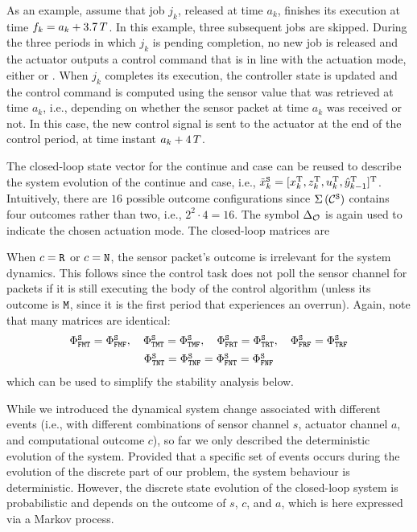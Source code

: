 As an example, assume that job $j_k$, released at time $a_k$, finishes its execution at time $f_k = a_k + 3.7\,T$.
In this example, three subsequent jobs are skipped.
During the three periods in which $j_k$ is pending completion, no new job is released and the actuator outputs a control command that is in line with the actuation mode, either \tH{} or \tZ{}.
When $j_k$ completes its execution, the controller state is updated and the control command is computed using the sensor value that was retrieved at time $a_k$, i.e., depending on whether the sensor packet at time $a_k$ was received or not.
In this case, the new control signal is sent to the actuator at the end of the control period, at time instant $a_k+4\,T$.

The closed-loop state vector for the continue and \tK{} case can be reused to describe the system evolution of the continue and \tS{} case, i.e., $\tilde x_k^{\texttt{S}} = [ x_k^{\mathrm{\small{T}}}{}, z_k^{\mathrm{\small{T}}}{}, u_k^{\mathrm{\small{T}}}{}, \hat y_{k-1}^{\mathrm{\small{T}}}{} ]^{\mathrm{\small{T}}}{}$.
Intuitively, there are $16$ possible outcome configurations since $\Sigma\,({\mathcal{C}^{\texttt{S}}}){}$ contains four outcomes rather than two, i.e., $2^2\cdot 4=16$.
The symbol $\Delta_{\mathcal{O}}$ is again used to indicate the chosen actuation mode.
The closed-loop matrices are
{\small
%
}

When $c=\texttt{R}$ or $c=\texttt{N}$, the sensor packet's outcome is irrelevant for the system dynamics.
This follows since the control task does not poll the sensor channel for packets if it is still executing the body of the control algorithm (unless its outcome is $\texttt{M}$, since it is the first period that experiences an overrun).
Again, note that many matrices are identical:
\begin{equation*}
\begin{matrix}
    \Phi^{\texttt{S}}_{\texttt{F}\texttt{M}\texttt{T}} = \Phi^{\texttt{S}}_{\texttt{F}\texttt{M}\texttt{F}},\quad \Phi^{\texttt{S}}_{\texttt{T}\texttt{M}\texttt{T}} = \Phi^{\texttt{S}}_{\texttt{T}\texttt{M}\texttt{F}}, \quad \Phi^{\texttt{S}}_{\texttt{F}\texttt{R}\texttt{T}} = \Phi^{\texttt{S}}_{\texttt{T}\texttt{R}\texttt{T}},\quad \Phi^{\texttt{S}}_{\texttt{F}\texttt{R}\texttt{F}} = \Phi^{\texttt{S}}_{\texttt{T}\texttt{R}\texttt{F}} \\[1ex]
    \Phi^{\texttt{S}}_{\texttt{T}\texttt{N}\texttt{T}} = \Phi^{\texttt{S}}_{\texttt{T}\texttt{N}\texttt{F}} = \Phi^{\texttt{S}}_{\texttt{F}\texttt{N}\texttt{T}} = \Phi^{\texttt{S}}_{\texttt{F}\texttt{N}\texttt{F}} \\
    \end{matrix}
\end{equation*}
which can be used to simplify the stability analysis below.

While we introduced the dynamical system change associated with different events (i.e., with different combinations of sensor channel $s$, actuator channel $a$, and computational outcome $c$), so far we only described the deterministic evolution of the system.
Provided that a specific set of events occurs during the evolution of the discrete part of our problem, the system behaviour is deterministic.
However, the discrete state evolution of the closed-loop system is probabilistic and depends on the outcome of $s$, $c$, and $a$, which is here expressed via a Markov process.

